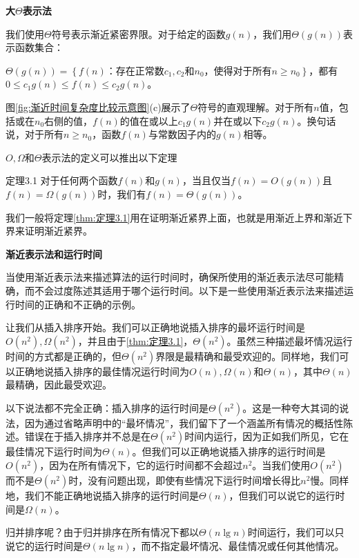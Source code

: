 \documentclass[lang=cn,newtx,10pt,scheme=chinese]{elegantbook}
\begin{document}
\textbf{大$\Theta$表示法}

我们使用$\Theta$符号表示渐近紧密界限。对于给定的函数$g(n)$，我们用$\Theta(g(n))$表示函数集合：

$\Theta(g(n))=\left\{f(n)\right.$：存在正常数$c_1, c_2$和$n_0$，使得对于所有$\left.n \geq n_0\right\}$，都有$0 \leq c_1 g(n) \leq f(n) \leq c_2 g(n)$。

图\ref{fig:渐近时间复杂度比较示意图}(c)展示了$\Theta$符号的直观理解。对于所有$n$值，包括或在$n_0$右侧的值，$f(n)$的值在或以上$c_1 g(n)$并在或以下$c_2 g(n)$。换句话说，对于所有$n \geq n_0$，函数$f(n)$与常数因子内的$g(n)$相等。

$O, \Omega$和$\Theta$表示法的定义可以推出以下定理

\begin{theorem}{}{定理3.1}
对于任何两个函数$f(n)$和$g(n)$，当且仅当$f(n)=O(g(n))$且$f(n)=\Omega(g(n))$时，我们有$f(n)=\Theta(g(n))$。
\end{theorem}

我们一般将定理\ref{thm:定理3.1}用在证明渐近紧界上面，也就是用渐近上界和渐近下界来证明渐近紧界。

\textbf{渐近表示法和运行时间}

当使用渐近表示法来描述算法的运行时间时，确保所使用的渐近表示法尽可能精确，而不会过度陈述其适用于哪个运行时间。以下是一些使用渐近表示法来描述运行时间的正确和不正确的示例。

让我们从插入排序开始。我们可以正确地说插入排序的最坏运行时间是$O\left(n^2\right), \Omega\left(n^2\right)$，并且由于\ref{thm:定理3.1}，$\Theta\left(n^2\right)$。虽然三种描述最坏情况运行时间的方式都是正确的，但$\Theta\left(n^2\right)$界限是最精确和最受欢迎的。同样地，我们可以正确地说插入排序的最佳情况运行时间为$O(n), \Omega(n)$和$\Theta(n)$，其中$\Theta(n)$最精确，因此最受欢迎。

以下说法都不完全正确：插入排序的运行时间是$\Theta\left(n^2\right)$。这是一种夸大其词的说法，因为通过省略声明中的``最坏情况''，我们留下了一个涵盖所有情况的概括性陈述。错误在于插入排序并不总是在$\Theta\left(n^2\right)$时间内运行，因为正如我们所见，它在最佳情况下运行时间为$\Theta(n)$。但我们可以正确地说插入排序的运行时间是$O\left(n^2\right)$，因为在所有情况下，它的运行时间都不会超过$n^2$。当我们使用$O\left(n^2\right)$而不是$\Theta\left(n^2\right)$时，没有问题出现，即使有些情况下运行时间增长得比$n^2$慢。同样地，我们不能正确地说插入排序的运行时间是$\Theta(n)$，但我们可以说它的运行时间是$\Omega(n)$。

归并排序呢？由于归并排序在所有情况下都以$\Theta(n\lg n)$时间运行，我们可以只说它的运行时间是$\Theta(n\lg n)$，而不指定最坏情况、最佳情况或任何其他情况。
\end{document}
